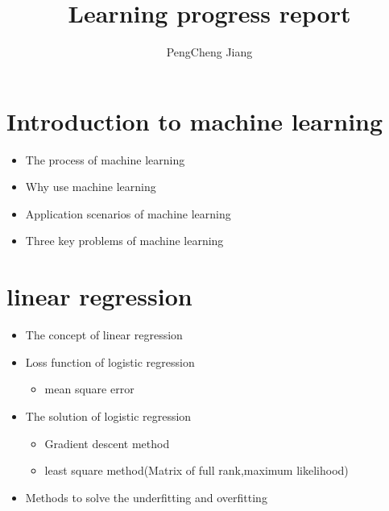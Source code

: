 \documentclass{amsart}
\begin{document}
%
%
\title[Learning Process]{Learning progress report}%

\author{PengCheng Jiang}
\address[A.~1]{School of Computer Science,\\ 
JiLin University, jilin 130000, China}%


%
\date{\gitAuthorDate}%


\maketitle
\tableofcontents

\newpage

\section{Introduction to machine learning}
    \begin{itemize}
        \item The process of machine learning
        \item Why use machine learning
        \item Application scenarios of machine learning
        \item Three key problems of machine learning       
    \end{itemize}    
\section{linear regression}
    \begin{itemize}
        \item The concept of linear regression
        \item Loss function of logistic regression
            \begin{itemize}
                \item mean square error
            \end{itemize}
        \item The solution of logistic regression
            \begin{itemize}
                \item Gradient descent method
                \item least square method(Matrix of full rank,maximum likelihood)
            \end{itemize}
        \item Methods to solve the underfitting and overfitting
    \end{itemize}   
\end{document}
